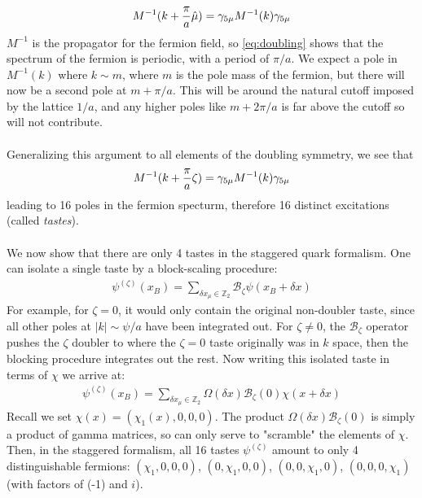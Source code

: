 \begin{align}
	M^{-1}(k+{\pi\over a}\hat{\mu}) = \gamma_{5\mu} M^{-1}(k) \gamma_{5\mu}
	\label{eq:doubling}
\end{align}
$M^{-1}$ is the propagator for the fermion field, so \ref{eq:doubling} shows that the spectrum of the fermion is periodic, with a period of $\pi/a$. We expect a pole in $M^{-1}(k)$ where $k \sim m$, where $m$ is the pole mass of the fermion, but there will now be a second pole at $m + \pi/a$. This will be around the natural cutoff imposed by the lattice $1/a$, and any higher poles like $m+2\pi/a$ is far above the cutoff so will not contribute.  
\\ \\
Generalizing this argument to all elements of the doubling symmetry, we see that
\begin{align}
	M^{-1}(k+{\pi\over a}\zeta) = \gamma_{5\mu} M^{-1}(k) \gamma_{5\mu}
\end{align}
leading to 16 poles in the fermion specturm, therefore 16 distinct excitations (called \textit{tastes}).
\\ \\
We now show that there are only 4 tastes in the staggered quark formalism. 
One can isolate a single taste by a block-scaling procedure:
\begin{align}
	\psi^{(\zeta)}(x_B) = \sum_{\delta x_{\mu} \in \mathbb{Z}_2} \mathcal{B}_{\zeta} \psi(x_B + \delta x)
\end{align}
For example, for $\zeta = 0$, it would only contain the original non-doubler taste, since all other poles at $|k|\sim\psi/a$ have been integrated out. For $\zeta \neq 0$, the $\mathcal{B}_{\zeta}$ operator pushes the $\zeta$ doubler to where the $\zeta=0$ taste originally was in $k$ space, then the blocking procedure integrates out the rest. Now writing this isolated taste in terms of $\chi$ we arrive at:
\begin{align}
	\psi^{(\zeta)}(x_B) = \sum_{\delta x_{\mu} \in \mathbb{Z}_2} \Omega(\delta x) \mathcal{B}_{\zeta}(0) \chi(x+\delta x)
\end{align} 
Recall we set $\chi(x) = (\chi_1(x),0,0,0)$. The product $\Omega(\delta x) \mathcal{B}_{\zeta}(0)$ is simply a product of gamma matrices, so can only serve to "scramble" the elements of $\chi$. Then, in the staggered formalism, all 16 tastes $\psi^{(\zeta)}$ amount to only 4 distinguishable fermions: $(\chi_1,0,0,0)$, $(0,\chi_1,0,0)$, $(0,0,\chi_1,0)$, $(0,0,0,\chi_1)$ (with factors of (-1) and $i$).


